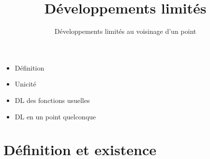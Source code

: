 







\title{{\bf Développements limités}}
\subtitle{Développements limités au voisinage d'un point}

\begin{frame}
  
  \debutmontitre

  \pause

{\footnotesize
\hfill
{}
\begin{minipage}{0.6\textwidth}
  \begin{itemize}
    \item<3-> Définition
    \item<4-> Unicité
    \item<5-> DL des fonctions usuelles
    \item<6-> DL en un point quelconque
  \end{itemize}
\end{minipage}
}

\end{frame}

\setcounter{framenumber}{0}




\section{Définition et existence}


